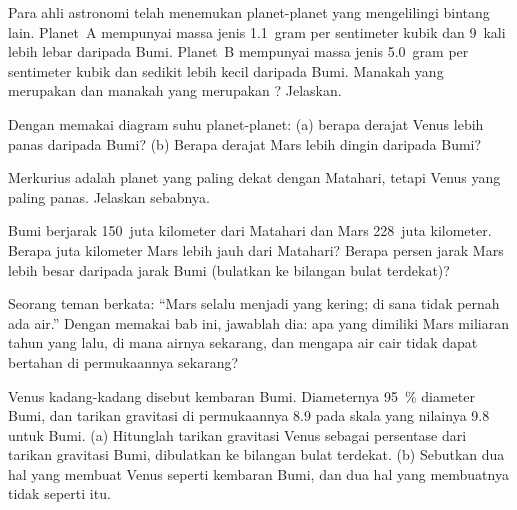 \begin{exercise}[$\star\star$]\label{exo:g6:earth-a-planet:7}
Para ahli astronomi telah menemukan planet-planet yang mengelilingi bintang
lain. Planet~A mempunyai massa jenis 1.1~gram per sentimeter kubik dan
9~kali lebih lebar daripada Bumi. Planet~B mempunyai massa jenis 5.0~gram
per sentimeter kubik dan sedikit lebih kecil daripada Bumi. Manakah yang
merupakan  dan manakah yang merupakan ?
Jelaskan.
\end{exercise}

\begin{exercise}[$\star\star$]\label{exo:g6:earth-a-planet:8}
Dengan memakai diagram suhu planet-planet: (a) berapa derajat Venus lebih
panas daripada Bumi? (b) Berapa derajat Mars lebih dingin daripada Bumi?
\end{exercise}

\begin{exercise}[$\star\star$]\label{exo:g6:earth-a-planet:9}
Merkurius adalah planet yang paling dekat dengan Matahari, tetapi Venus yang
paling panas. Jelaskan sebabnya.
\end{exercise}

\begin{exercise}[$\star\star$]\label{exo:g6:earth-a-planet:10}
Bumi berjarak 150~juta kilometer dari Matahari dan Mars 228~juta kilometer.
Berapa juta kilometer Mars lebih jauh dari Matahari? Berapa persen jarak
Mars lebih besar daripada jarak Bumi (bulatkan ke bilangan bulat terdekat)?
\end{exercise}

\begin{exercise}[$\star\star\star$]\label{exo:g6:earth-a-planet:11}
Seorang teman berkata: ``Mars selalu menjadi  yang kering; di sana
tidak pernah ada air.'' Dengan memakai bab ini, jawablah dia: apa yang
dimiliki Mars miliaran tahun yang lalu, di mana airnya sekarang, dan mengapa
air cair tidak dapat bertahan di permukaannya sekarang?
\end{exercise}

\begin{exercise}[$\star\star\star$]\label{exo:g6:earth-a-planet:12}
Venus kadang-kadang disebut kembaran Bumi. Diameternya 95~\% diameter
Bumi, dan tarikan gravitasi di permukaannya 8.9 pada skala yang nilainya
9.8 untuk Bumi. (a) Hitunglah tarikan gravitasi Venus sebagai persentase
dari tarikan gravitasi Bumi,
dibulatkan ke bilangan bulat terdekat. (b) Sebutkan dua hal yang membuat
Venus seperti kembaran Bumi, dan dua hal yang membuatnya tidak seperti itu.
\end{exercise}

